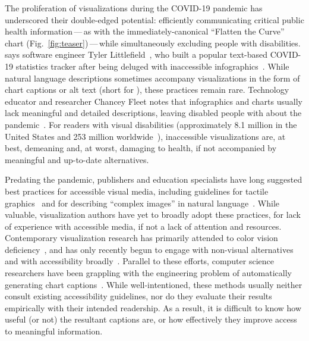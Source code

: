 \label{section:1}

The proliferation of visualizations during the {\smaller COVID-19} pandemic has underscored their double-edged potential: efficiently communicating critical public health information\,---\,as with the immediately-canonical ``Flatten the Curve'' chart (Fig.~\ref{fig:teaser})\,---\,while simultaneously excluding people with disabilities.
 says software engineer Tyler Littlefield~\cite{ehrenkranz_vital_2020}, who built a popular text-based {\smaller COVID-19} statistics tracker after being deluged with inaccessible infographics~\cite{sutton_accessible_2020, littlefield_covid-19_2020}.
While natural language descriptions sometimes accompany visualizations in the form of chart captions or alt text (short for ), these practices remain rare.
Technology educator and researcher Chancey Fleet notes that infographics and charts usually lack meaningful and detailed descriptions, leaving disabled people with  about the pandemic~\cite{ehrenkranz_vital_2020}.
For readers with visual disabilities (approximately 8.1 million in the United States and 253 million worldwide~\cite{ackland_world_2017}), inaccessible visualizations are, at best, demeaning and, at worst, damaging to health, if not accompanied by meaningful and up-to-date alternatives.

Predating the pandemic, publishers and education specialists have long suggested best practices for accessible visual media, including guidelines for tactile graphics~\cite{hasty_guidelines_2011} and for describing ``complex images'' in natural language~\cite{w3c_wai_2019, gould_effective_2008}.
While valuable, visualization authors have yet to broadly adopt these practices, for lack of experience with accessible media, if not a lack of attention and resources.
Contemporary visualization research has primarily attended to color vision deficiency~\cite{chaparro_applications_2017,nunez_optimizing_2018, oliveira_towards_2013}, and has only recently begun to engage with non-visual alternatives~\cite{choi_visualizing_2019, lundgard_sociotechnical_2019} and with accessibility broadly~\cite{kim_accessible_2021, wu_understanding_2021}.
Parallel to these efforts, computer science researchers have been grappling with the engineering problem of automatically generating chart captions~\cite{demir_summarizing_2012, obeid_chart--text_2020, qian_formative_2020}.
While well-intentioned, these methods usually neither consult existing accessibility guidelines, nor do they evaluate their results empirically with their intended readership.
As a result, it is difficult to know how useful (or not) the resultant captions are, or how effectively they improve access to meaningful information.

